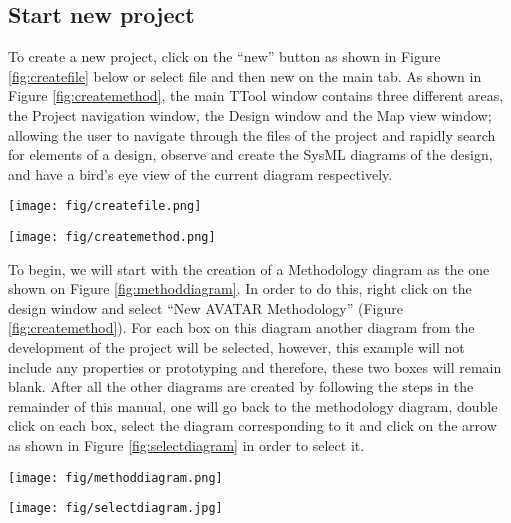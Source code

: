 \documentclass[12pt]{article}
\begin{document}
\subsection{Start new project}
To create a new project, click on the “new” button as shown in Figure \ref{fig:createfile} below or select file and then new on the main tab. As shown in Figure \ref{fig:createmethod}, the main TTool window contains three different areas, the Project navigation window, the Design window and the Map view window; allowing the user to navigate through the files of the project and rapidly search for elements of a design, observe and create the SysML diagrams of the design, and have a bird’s eye view of the current diagram respectively.

\begin{figure*}[htbp]
\centering
\texttt{[image: fig/createfile.png]}
\caption{Create a file} \label{fig:createfile}
\end{figure*}

\begin{figure*}[htbp]
\centering
\texttt{[image: fig/createmethod.png]}
\caption{Create an AVATAR Methodology} \label{fig:createmethod}
\end{figure*}

To begin, we will start with the creation of a Methodology diagram as the one shown on Figure \ref{fig:methoddiagram}. In order to do this, right click on the design window and select “New AVATAR Methodology” (Figure \ref{fig:createmethod}). For each box on this diagram another diagram from the development of the project will be selected, however, this example will not include any properties or prototyping and therefore, these two boxes will remain blank. After all the other diagrams are created by following the steps in the remainder of this manual, one will go back to the methodology diagram, double click on each box, select the diagram corresponding to it and click on the arrow as shown in Figure \ref{fig:selectdiagram} in order to select it. 


\begin{figure*}[htbp]
\centering
\texttt{[image: fig/methoddiagram.png]}
\caption{Methodology Diagram} \label{fig:methoddiagram}
\end{figure*}


\begin{figure*}[htbp]
\centering
\texttt{[image: fig/selectdiagram.jpg]}
\caption{Selecting Diagrams} \label{fig:selectdiagram}
\end{figure*}
\end{document}
